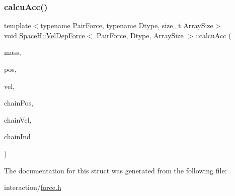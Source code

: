 \subsubsection{\texorpdfstring{calcu\+Acc()}{calcuAcc()}\hspace{0.1cm}{\footnotesize\ttfamily [2/2]}}
{\footnotesize\ttfamily template$<$typename Pair\+Force, typename Dtype, size\+\_\+t Array\+Size$>$ \\
void \mbox{\hyperlink{struct_space_h_1_1_vel_dep_force}{Space\+H\+::\+Vel\+Dep\+Force}}$<$ Pair\+Force, Dtype, Array\+Size $>$\+::calcu\+Acc (\begin{DoxyParamCaption}\item[{const \mbox{\hyperlink{struct_space_h_1_1_vel_dep_force_ae4efbb88779fc063293b7853184378ac}{Scalar\+Array}} \&}]{mass,  }\item[{const \mbox{\hyperlink{struct_space_h_1_1_vel_dep_force_ad2d0301ffff67a74018b92c17a3475de}{Vector\+Array}} \&}]{pos,  }\item[{const \mbox{\hyperlink{struct_space_h_1_1_vel_dep_force_ad2d0301ffff67a74018b92c17a3475de}{Vector\+Array}} \&}]{vel,  }\item[{const \mbox{\hyperlink{struct_space_h_1_1_vel_dep_force_ad2d0301ffff67a74018b92c17a3475de}{Vector\+Array}} \&}]{chain\+Pos,  }\item[{const \mbox{\hyperlink{struct_space_h_1_1_vel_dep_force_ad2d0301ffff67a74018b92c17a3475de}{Vector\+Array}} \&}]{chain\+Vel,  }\item[{const \mbox{\hyperlink{struct_space_h_1_1_vel_dep_force_a81473a733ed71f51b81323c705283195}{Index\+Array}} \&}]{chain\+Ind }\end{DoxyParamCaption})\hspace{0.3cm}{\ttfamily [inline]}}



The documentation for this struct was generated from the following file\+:\begin{DoxyCompactItemize}
\item 
interaction/\mbox{\hyperlink{force_8h}{force.\+h}}\end{DoxyCompactItemize}
